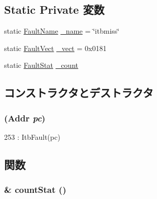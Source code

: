 \subsection*{Static Private 変数}
\begin{DoxyCompactItemize}
\item 
static \hyperlink{sim_2faults_8hh_abb196df64725e5c2568c900cf130d8d7}{FaultName} \hyperlink{classAlphaISA_1_1ItbPageFault_ac79073ffcd2c66a09bcd3bd3ad206019}{\_\-name} = \char`\"{}itbmiss\char`\"{}
\item 
static \hyperlink{classm5_1_1params_1_1Addr}{FaultVect} \hyperlink{classAlphaISA_1_1ItbPageFault_ad9e5855b9db0b2824cf6c507be4a872e}{\_\-vect} = 0x0181
\item 
static \hyperlink{classStats_1_1Scalar}{FaultStat} \hyperlink{classAlphaISA_1_1ItbPageFault_a4bff925c412f331c5aaf6a39b79619ff}{\_\-count}
\end{DoxyCompactItemize}


\subsection{コンストラクタとデストラクタ}
\hypertarget{classAlphaISA_1_1ItbPageFault_a47740fcdb72d57c57dcb39b14a4e47db}{
\subsubsection[{ItbPageFault}]{ ({\bf Addr} {\em pc})}}
\label{classAlphaISA_1_1ItbPageFault_a47740fcdb72d57c57dcb39b14a4e47db}



\begin{DoxyCode}
253 : ItbFault(pc) { }
\end{DoxyCode}


\subsection{関数}
\hypertarget{classAlphaISA_1_1ItbPageFault_a6c79663c761ff57265459f7e3aefaf4c}{
\subsubsection[{countStat}]{\& countStat ()}}
\label{classAlphaISA_1_1ItbPageFault_a6c79663c761ff57265459f7e3aefaf4c}


